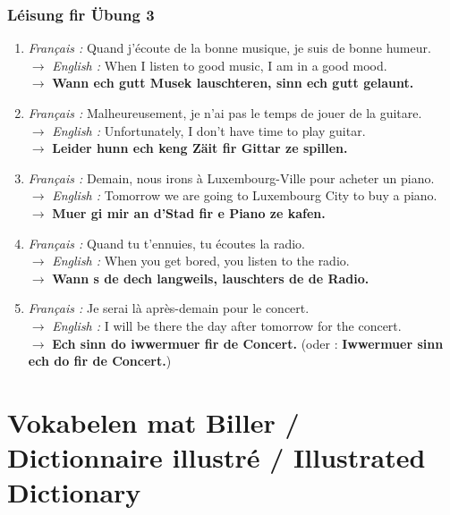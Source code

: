 \subsubsection*{Léisung fir Übung 3}
\begin{enumerate}
    \item \textit{Français :} Quand j'écoute de la bonne musique, je suis de bonne humeur. \\
    $\rightarrow$ \textit{English :} When I listen to good music, I am in a good mood. \\
    $\rightarrow$ \textbf{Wann ech gutt Musek lauschteren, sinn ech gutt gelaunt.}
    \item \textit{Français :} Malheureusement, je n'ai pas le temps de jouer de la guitare. \\
    $\rightarrow$ \textit{English :} Unfortunately, I don't have time to play guitar. \\
    $\rightarrow$ \textbf{Leider hunn ech keng Zäit fir Gittar ze spillen.}
    \item \textit{Français :} Demain, nous irons à Luxembourg-Ville pour acheter un piano. \\
    $\rightarrow$ \textit{English :} Tomorrow we are going to Luxembourg City to buy a piano. \\
    $\rightarrow$ \textbf{Muer gi mir an d'Stad fir e Piano ze kafen.}
    \item \textit{Français :} Quand tu t'ennuies, tu écoutes la radio. \\
    $\rightarrow$ \textit{English :} When you get bored, you listen to the radio. \\
    $\rightarrow$ \textbf{Wann s de dech langweils, lauschters de de Radio.}
    \item \textit{Français :} Je serai là après-demain pour le concert. \\
    $\rightarrow$ \textit{English :} I will be there the day after tomorrow for the concert. \\
    $\rightarrow$ \textbf{Ech sinn do iwwermuer fir de Concert.} (oder : \textbf{Iwwermuer sinn ech do fir de Concert.})
\end{enumerate}

\vspace{2em}

\section[Vokabelen mat Biller / Picture Dictionary]{Vokabelen mat Biller / Dictionnaire illustré / Illustrated Dictionary}

